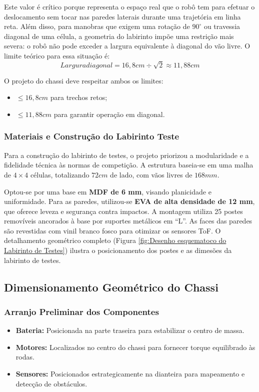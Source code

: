 Este valor é crítico porque representa o espaço real que o robô tem para efetuar o deslocamento sem tocar nas paredes laterais durante uma trajetória em linha reta. Além disso, para manobras que exigem uma rotação de $90^\circ$ ou travessia diagonal de uma célula, a geometria do labirinto impõe uma restrição mais severa: o robô não pode exceder a largura equivalente à diagonal do vão livre. O limite teórico para essa situação é:
\begin{equation}
{Largura diagonal} = 16,8{ cm} \div \sqrt{2} \approx 11,88{ cm}
\end{equation}

O projeto do chassi deve respeitar ambos os limites:
\begin{itemize}
    \item $\le 16,8{ cm}$ para trechos retos;
    \item $\le 11,88{ cm}$ para garantir operação em diagonal.
\end{itemize}

\subsubsection{Materiais e Construção do Labirinto Teste}
Para a construção do labirinto de testes, o projeto priorizou a modularidade e a fidelidade técnica às normas de competição. A estrutura baseia-se em uma malha de $4 \times 4$ células, totalizando $72{ cm}$ de lado, com vãos livres de $168{ mm}$.

Optou-se por uma base em \textbf{MDF de 6 mm}, visando planicidade e uniformidade. Para as paredes, utilizou-se \textbf{EVA de alta densidade de 12 mm}, que oferece leveza e segurança contra impactos. A montagem utiliza 25 postes removíveis ancorados à base por suportes metálicos em ``L''. As faces das paredes são revestidas com vinil branco fosco para otimizar os sensores ToF. O detalhamento geométrico completo (Figura \ref{fig:Desenho esquematoco do Labirinto de Testes}) ilustra o posicionamento dos postes e as dimesões da labirinto de testes. 

\subsection{Dimensionamento Geométrico do Chassi}

\subsubsection{Arranjo Preliminar dos Componentes}
\begin{itemize}
    \item \textbf{Bateria:} Posicionada na parte traseira para estabilizar o centro de massa.
    \item \textbf{Motores:} Localizados no centro do chassi para fornecer torque equilibrado às rodas.
    \item \textbf{Sensores:} Posicionados estrategicamente na dianteira para mapeamento e detecção de obstáculos.
\end{itemize}


